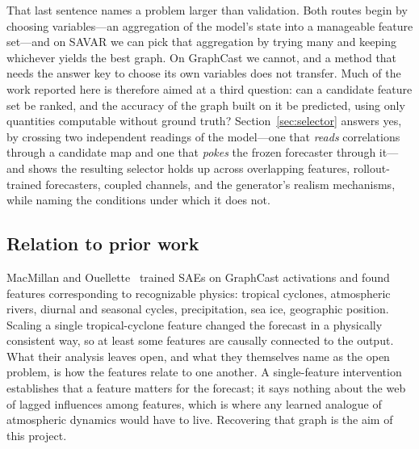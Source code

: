 That last sentence names a problem larger than validation. Both routes begin by
choosing variables---an aggregation of the model's state into a manageable feature
set---and on SAVAR we can pick that aggregation by trying many and keeping
whichever yields the best graph. On GraphCast we cannot, and a method that needs
the answer key to choose its own variables does not transfer. Much of the work
reported here is therefore aimed at a third question: can a candidate feature set
be ranked, and the accuracy of the graph built on it be predicted, using only
quantities computable without ground truth? Section~\ref{sec:selector} answers
yes, by crossing two independent readings of the model---one that \emph{reads}
correlations through a candidate map and one that \emph{pokes} the frozen
forecaster through it---and shows the resulting selector holds up across
overlapping features, rollout-trained forecasters, coupled channels, and the
generator's realism mechanisms, while naming the conditions under which it does
not.

\subsection{Relation to prior work}

MacMillan and Ouellette~\cite{macmillan2025} trained SAEs on GraphCast activations
and found features corresponding to recognizable physics: tropical cyclones,
atmospheric rivers, diurnal and seasonal cycles, precipitation, sea ice, geographic
position. Scaling a single tropical-cyclone feature changed the forecast in a
physically consistent way, so at least some features are causally connected to the
output. What their analysis leaves open, and what they themselves name as the open
problem, is how the features relate to one another. A single-feature intervention
establishes that a feature matters for the forecast; it says nothing about the web
of lagged influences among features, which is where any learned analogue of
atmospheric dynamics would have to live. Recovering that graph is the aim of this
project.
